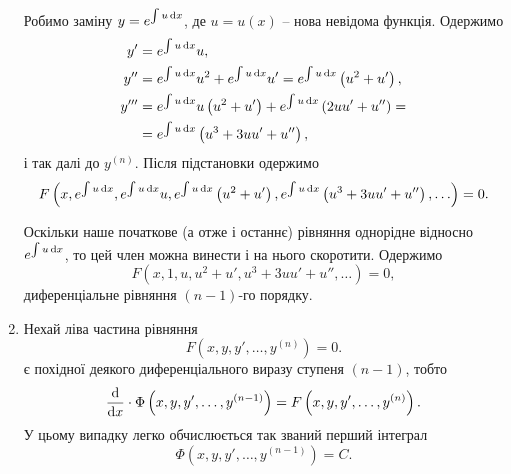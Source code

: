 \begin{enumerate}
Робимо заміну $y = e^{\int u \mathop{}\!\mathrm{d} x}$, де $u=u(x)$ -- нова невідома функція. Одержимо
\begin{align*}
	y' &= e^{\int u \mathop{}\!\mathrm{d} x} u, \\
	y^{\prime\prime} &= e^{\int u \mathop{}\!\mathrm{d} x}  u^2 + e^{\int u \mathop{}\!\mathrm{d} x} u' = e^{\int u \mathop{}\!\mathrm{d} x} \left(u^2 + u'\right), \\
	y^{\prime\prime\prime} &= e^{\int u \mathop{}\!\mathrm{d} x} u \left( u^2 + u' \right) + e^{\int u \mathop{}\!\mathrm{d} x}  \left(2 u u' + u''\right) = \\ 
	&= e^{\int u \mathop{}\!\mathrm{d} x} \left( u^3 + 3 u u' + u'' \right), \nonumber
\end{align*}
і так далі до $y^{(n)}$. Після підстановки одержимо
\begin{equation*}
	F \left( x, e^{\int u \mathop{}\!\mathrm{d} x}, e^{\int u \mathop{}\!\mathrm{d} x} u, e^{\int u \mathop{}\!\mathrm{d} x} \left(u^2 + u'\right), e^{\int u \mathop{}\!\mathrm{d} x} \left( u^3 + 3 u u' + u'' \right), \ldots \right) = 0.
\end{equation*}

Оскільки наше початкове (а отже і останнє) рівняння однорідне відносно $e^{\int u\mathop{}\!\mathrm{d} x}$, то цей член можна винести і на нього скоротити. Одержимо
\begin{equation*}
	F \left( x, 1, u, u^2 + u', u^3 + 3 u u' + u'', \ldots \right) = 0,
\end{equation*} 
диференціальне рівняння $(n-1)$-го порядку. 
\item Нехай ліва частина рівняння
\begin{equation*}
	F \left( x, y, y', \ldots, y^{(n)} \right) = 0.
\end{equation*}
є похідної деякого диференціального виразу ступеня $(n-1)$, тобто
\begin{equation*}
	\frac{\mathop{}\!\mathrm{d}}{\mathop{}\!\mathrm{d} x} \cdot \Phi\left( x, y, y', \ldots, y^{(n-1)} \right) = F \left( x, y, y', \ldots, y^{(n)} \right).
\end{equation*}
У цьому випадку легко обчислюється так званий перший інтеграл
\begin{equation*}
	\Phi\left( x, y, y', \ldots, y^{(n-1)} \right) = C.
\end{equation*}


\end{enumerate}
